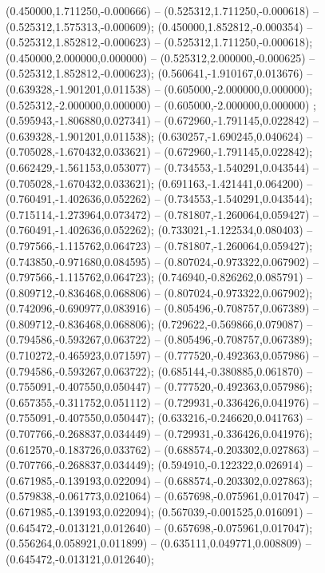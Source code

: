  (0.450000,1.711250,-0.000666) -- (0.525312,1.711250,-0.000618) -- (0.525312,1.575313,-0.000609);
 (0.450000,1.852812,-0.000354) -- (0.525312,1.852812,-0.000623) -- (0.525312,1.711250,-0.000618);
 (0.450000,2.000000,0.000000) -- (0.525312,2.000000,-0.000625) -- (0.525312,1.852812,-0.000623);
 (0.560641,-1.910167,0.013676) -- (0.639328,-1.901201,0.011538) -- (0.605000,-2.000000,0.000000);
 (0.525312,-2.000000,0.000000) -- (0.605000,-2.000000,0.000000) ;
 (0.595943,-1.806880,0.027341) -- (0.672960,-1.791145,0.022842) -- (0.639328,-1.901201,0.011538);
 (0.630257,-1.690245,0.040624) -- (0.705028,-1.670432,0.033621) -- (0.672960,-1.791145,0.022842);
 (0.662429,-1.561153,0.053077) -- (0.734553,-1.540291,0.043544) -- (0.705028,-1.670432,0.033621);
 (0.691163,-1.421441,0.064200) -- (0.760491,-1.402636,0.052262) -- (0.734553,-1.540291,0.043544);
 (0.715114,-1.273964,0.073472) -- (0.781807,-1.260064,0.059427) -- (0.760491,-1.402636,0.052262);
 (0.733021,-1.122534,0.080403) -- (0.797566,-1.115762,0.064723) -- (0.781807,-1.260064,0.059427);
 (0.743850,-0.971680,0.084595) -- (0.807024,-0.973322,0.067902) -- (0.797566,-1.115762,0.064723);
 (0.746940,-0.826262,0.085791) -- (0.809712,-0.836468,0.068806) -- (0.807024,-0.973322,0.067902);
 (0.742096,-0.690977,0.083916) -- (0.805496,-0.708757,0.067389) -- (0.809712,-0.836468,0.068806);
 (0.729622,-0.569866,0.079087) -- (0.794586,-0.593267,0.063722) -- (0.805496,-0.708757,0.067389);
 (0.710272,-0.465923,0.071597) -- (0.777520,-0.492363,0.057986) -- (0.794586,-0.593267,0.063722);
 (0.685144,-0.380885,0.061870) -- (0.755091,-0.407550,0.050447) -- (0.777520,-0.492363,0.057986);
 (0.657355,-0.311752,0.051112) -- (0.729931,-0.336426,0.041976) -- (0.755091,-0.407550,0.050447);
 (0.633216,-0.246620,0.041763) -- (0.707766,-0.268837,0.034449) -- (0.729931,-0.336426,0.041976);
 (0.612570,-0.183726,0.033762) -- (0.688574,-0.203302,0.027863) -- (0.707766,-0.268837,0.034449);
 (0.594910,-0.122322,0.026914) -- (0.671985,-0.139193,0.022094) -- (0.688574,-0.203302,0.027863);
 (0.579838,-0.061773,0.021064) -- (0.657698,-0.075961,0.017047) -- (0.671985,-0.139193,0.022094);
 (0.567039,-0.001525,0.016091) -- (0.645472,-0.013121,0.012640) -- (0.657698,-0.075961,0.017047);
 (0.556264,0.058921,0.011899) -- (0.635111,0.049771,0.008809) -- (0.645472,-0.013121,0.012640);
